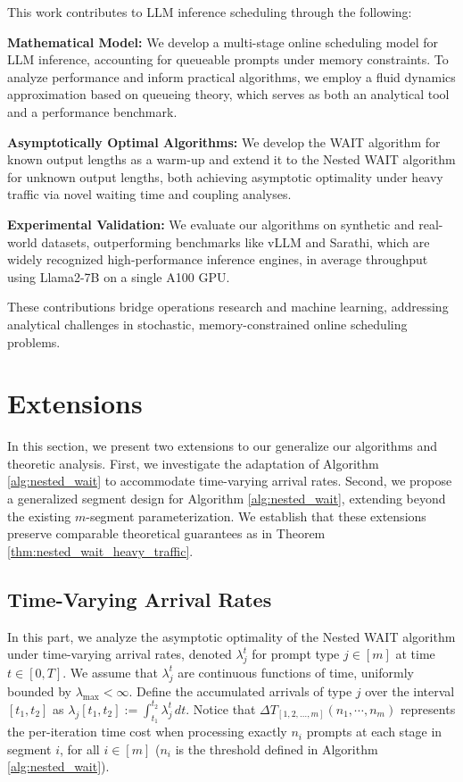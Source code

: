 \documentclass[preprint]{article}
\theoremstyle{plain}
\theoremstyle{definition}
\theoremstyle{remark}
\begin{document}
This work contributes to LLM inference scheduling through the following:

\textbf{Mathematical Model:} We develop a multi-stage online scheduling model for LLM inference, accounting for queueable prompts under memory constraints. To analyze performance and inform practical algorithms, we employ a fluid dynamics approximation based on queueing theory, which serves as both an analytical tool and a performance benchmark.

\textbf{Asymptotically Optimal Algorithms:} We develop the WAIT algorithm for known output lengths as a warm-up and extend it to the Nested WAIT algorithm for unknown output lengths, both achieving asymptotic optimality under heavy traffic via novel waiting time and coupling analyses.

\textbf{Experimental Validation:} We evaluate our algorithms on synthetic and real-world datasets, outperforming benchmarks like vLLM and Sarathi, which are widely recognized high-performance inference engines, in average throughput using Llama2-7B on a single A100 GPU.

These contributions bridge operations research and machine learning, addressing analytical challenges in stochastic, memory-constrained online scheduling problems.

\section{Extensions}\label{sec:extension}

In this section, we present two extensions to our generalize our algorithms and theoretic analysis. First, we investigate the adaptation of Algorithm \ref{alg:nested_wait} to accommodate time-varying arrival rates. Second, we propose a generalized segment design for Algorithm \ref{alg:nested_wait}, extending beyond the existing $m$-segment parameterization. We establish that these extensions preserve comparable theoretical guarantees as in Theorem \ref{thm:nested_wait_heavy_traffic}.

\subsection{Time-Varying Arrival Rates}\label{sec:time_varying}

In this part, we analyze the asymptotic optimality of the Nested WAIT algorithm under time-varying arrival rates, denoted $\lambda_j^t$ for prompt type $j \in [m]$ at time $t \in [0, T]$. We assume that $\lambda_j^t$ are continuous functions of time, uniformly bounded by $\lambda_{\max} < \infty$. Define the accumulated arrivals of type $j$ over the interval $[t_1, t_2]$ as $\lambda_j[t_1, t_2] := \int_{t_1}^{t_2} \lambda_j^t \, dt$. Notice that $\Delta T_{[1,2,\dots,m]}(n_1,\cdots,n_m)$ represents the per-iteration time cost when processing exactly $n_i$ prompts at each stage in segment $i$, for all $i \in [m]$ ($n_i$ is the threshold defined in Algorithm \ref{alg:nested_wait}).
\end{document}
